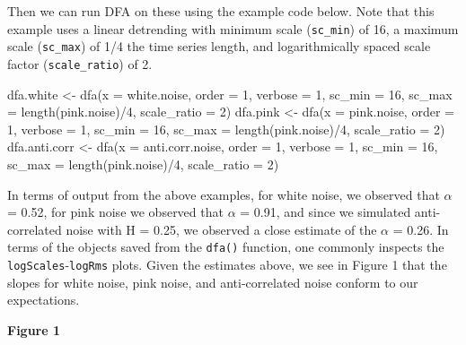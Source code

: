 \documentclass[
  english,
  man]{apa6}
\newenvironment{Shaded}{\begin{snugshade}}{\end{snugshade}}
\newcommand{\AttributeTok}[1]{\textcolor[rgb]{0.77,0.63,0.00}{#1}}
\newcommand{\DecValTok}[1]{\textcolor[rgb]{0.00,0.00,0.81}{#1}}
\newcommand{\FunctionTok}[1]{\textcolor[rgb]{0.00,0.00,0.00}{#1}}
\newcommand{\NormalTok}[1]{#1}
\newcommand{\OtherTok}[1]{\textcolor[rgb]{0.56,0.35,0.01}{#1}}
\newcommand{\SpecialCharTok}[1]{\textcolor[rgb]{0.00,0.00,0.00}{#1}}
\begin{document}
Then we can run DFA on these using the example code below. Note that
this example uses a linear detrending with minimum scale (\texttt{sc\_min}) of
16, a maximum scale (\texttt{sc\_max}) of 1/4 the time series length, and
logarithmically spaced scale factor (\texttt{scale\_ratio}) of 2.

\begin{Shaded}
\begin{Highlighting}[]
\NormalTok{dfa.white }\OtherTok{\textless{}{-}} \FunctionTok{dfa}\NormalTok{(}\AttributeTok{x =}\NormalTok{ white.noise, }\AttributeTok{order =} \DecValTok{1}\NormalTok{, }\AttributeTok{verbose =} \DecValTok{1}\NormalTok{,}
                \AttributeTok{sc\_min =} \DecValTok{16}\NormalTok{, }\AttributeTok{sc\_max =} \FunctionTok{length}\NormalTok{(pink.noise)}\SpecialCharTok{/}\DecValTok{4}\NormalTok{, }\AttributeTok{scale\_ratio =} \DecValTok{2}\NormalTok{)}
\NormalTok{dfa.pink }\OtherTok{\textless{}{-}} \FunctionTok{dfa}\NormalTok{(}\AttributeTok{x =}\NormalTok{ pink.noise, }\AttributeTok{order =} \DecValTok{1}\NormalTok{, }\AttributeTok{verbose =} \DecValTok{1}\NormalTok{,}
                \AttributeTok{sc\_min =} \DecValTok{16}\NormalTok{, }\AttributeTok{sc\_max =} \FunctionTok{length}\NormalTok{(pink.noise)}\SpecialCharTok{/}\DecValTok{4}\NormalTok{, }\AttributeTok{scale\_ratio =} \DecValTok{2}\NormalTok{)}
\NormalTok{dfa.anti.corr }\OtherTok{\textless{}{-}} \FunctionTok{dfa}\NormalTok{(}\AttributeTok{x =}\NormalTok{ anti.corr.noise, }\AttributeTok{order =} \DecValTok{1}\NormalTok{, }\AttributeTok{verbose =} \DecValTok{1}\NormalTok{,}
                \AttributeTok{sc\_min =} \DecValTok{16}\NormalTok{, }\AttributeTok{sc\_max =} \FunctionTok{length}\NormalTok{(pink.noise)}\SpecialCharTok{/}\DecValTok{4}\NormalTok{, }\AttributeTok{scale\_ratio =} \DecValTok{2}\NormalTok{)}
\end{Highlighting}
\end{Shaded}

In terms of output from the above examples, for white noise, we observed
that \(\alpha\) = 0.52, for pink noise we observed that
\(\alpha\) = 0.91, and since we simulated anti-correlated
noise with H = 0.25, we observed a close estimate of the \(\alpha\) =
0.26. In terms of the objects saved from the \texttt{dfa()}
function, one commonly inspects the \texttt{logScales}-\texttt{logRms} plots. Given
the estimates above, we see in Figure 1 that the slopes for white noise,
pink noise, and anti-correlated noise conform to our expectations.

\textbf{Figure 1}
\end{document}
